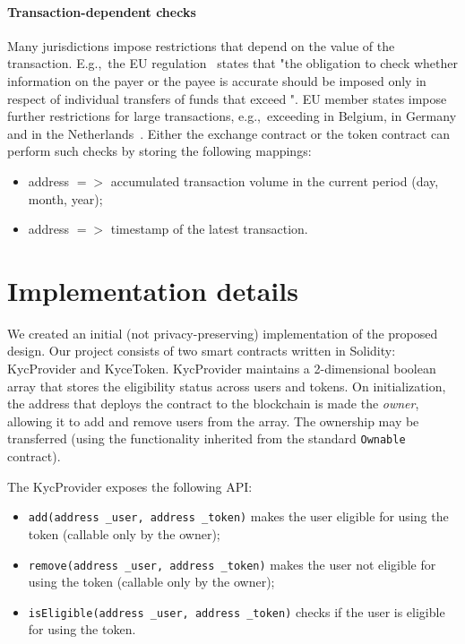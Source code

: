 \paragraph{Transaction-dependent checks}

Many jurisdictions impose restrictions that depend on the value of the transaction.
E.g.,~the EU regulation~\cite{EU847} states that "the obligation to check whether information on the payer or the payee is accurate should \textelp{} be imposed only in respect of individual transfers of funds that exceed ".
EU member states impose further restrictions for large transactions, e.g.,~exceeding  in Belgium,  in Germany and in the Netherlands~\cite{PWC2015}.
Either the exchange contract or the token contract can perform such checks by storing the following mappings:
\begin{itemize}
	\item address $=>$ accumulated transaction volume in the current period (day, month, year);
	\item address $=>$ timestamp of the latest transaction. 
\end{itemize}




\section{Implementation details}

We created an initial (not privacy-preserving) implementation of the proposed design.
Our project consists of two smart contracts written in Solidity: KycProvider and KyceToken.
KycProvider maintains a 2-dimensional boolean array that stores the eligibility status across users and tokens.
On initialization, the address that deploys the contract to the blockchain is made the \textit{owner}, allowing it to add and remove users from the array.
The ownership may be transferred (using the functionality inherited from the standard \texttt{Ownable} contract).

The KycProvider exposes the following API:

\begin{itemize}
	\item \texttt{add(address \_user, address \_token)} makes the user eligible for using the token (callable only by the owner);
	\item \texttt{remove(address \_user, address \_token)} makes the user not eligible for using the token (callable only by the owner);
	\item \texttt{isEligible(address \_user, address \_token)} checks if the user is eligible for using the token.
\end{itemize}

